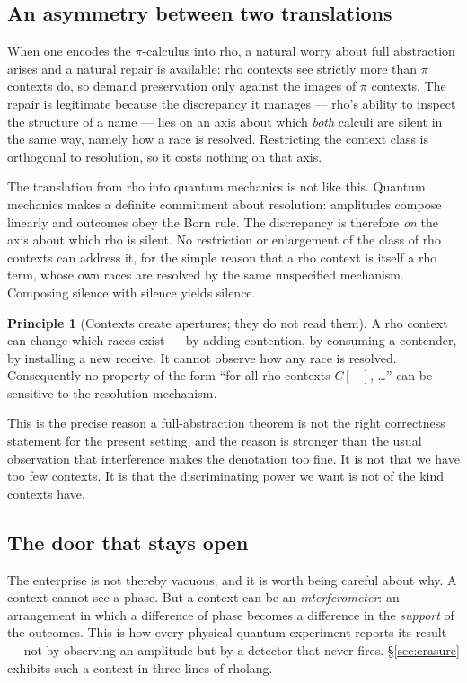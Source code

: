 \documentclass[11pt,a4paper]{article}
\theoremstyle{plain}
\theoremstyle{definition}
\newtheorem{principle}[theorem]{Principle}
\theoremstyle{remark}
\begin{document}
\subsection{An asymmetry between two translations}

When one encodes the $\pi$-calculus into rho, a natural worry about full
abstraction arises and a natural repair is available: rho contexts see strictly
more than $\pi$ contexts do, so demand preservation only against the images of
$\pi$ contexts. The repair is legitimate because the discrepancy it manages ---
rho's ability to inspect the structure of a name --- lies on an axis about which
\emph{both} calculi are silent in the same way, namely how a race is resolved.
Restricting the context class is orthogonal to resolution, so it costs nothing on
that axis.

The translation from rho into quantum mechanics is not like this. Quantum
mechanics makes a definite commitment about resolution: amplitudes compose
linearly and outcomes obey the Born rule. The discrepancy is therefore
\emph{on} the axis about which rho is silent. No restriction or enlargement of
the class of rho contexts can address it, for the simple reason that a rho
context is itself a rho term, whose own races are resolved by the same
unspecified mechanism. Composing silence with silence yields silence.

\begin{principle}[Contexts create apertures; they do not read them]\label{prin:aperture}
A rho context can change which races exist --- by adding contention, by
consuming a contender, by installing a new receive. It cannot observe how any
race is resolved. Consequently no property of the form ``for all rho contexts
$C[-]$, \dots'' can be sensitive to the resolution mechanism.
\end{principle}

This is the precise reason a full-abstraction theorem is not the right
correctness statement for the present setting, and the reason is stronger than
the usual observation that interference makes the denotation too fine. It is not
that we have too few contexts. It is that the discriminating power we want is not
of the kind contexts have.

\subsection{The door that stays open}

The enterprise is not thereby vacuous, and it is worth being careful about why.
A context cannot see a phase. But a context can be an \emph{interferometer}: an
arrangement in which a difference of phase becomes a difference in the
\emph{support} of the outcomes. This is how every physical quantum experiment
reports its result --- not by observing an amplitude but by a detector that never
fires. \S\ref{sec:erasure} exhibits such a context in three lines of rholang.
\end{document}

